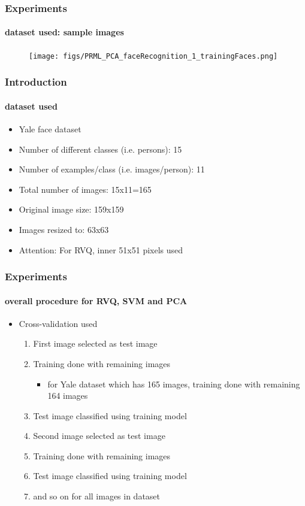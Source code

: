 \begin{frame}
\frametitle{Experiments}
\framesubtitle{dataset used: sample images}
\logoEvolution\mypagenum	
	\begin{figure}
		\texttt{[image: figs/PRML\_PCA\_faceRecognition\_1\_trainingFaces.png]}
	\end{figure}
\end{frame}

\begin{frame}
\frametitle{Introduction}
\framesubtitle{dataset used}
\logoCSIPCPL\mypagenum
	\begin{itemize}
		\item Yale face dataset
		\item Number of different classes (i.e. persons): 15
		\item Number of examples/class (i.e. images/person): 11
		\item Total number of images: 15x11=165
		\item Original image size: 159x159
		\item Images resized to: 63x63
		\item {\color{red}Attention: For RVQ, inner 51x51 pixels used}
	\end{itemize}
\end{frame}


\begin{frame}
\frametitle{Experiments}
\framesubtitle{overall procedure for RVQ, SVM and PCA}
\logoCSIPCPL\mypagenum
	\begin{itemize}
		\item {\color{red}Cross-validation} used
			\begin{enumerate}
				\item First image selected as test image
				\item Training done with remaining images
					\begin{itemize}
						\item for Yale dataset which has 165 images, training done with remaining 164 images
					\end{itemize}
				\item Test image classified using training model
				\item Second image selected as test image
				\item Training done with remaining images
				\item Test image classified using training model
				\item and so on for all images in dataset
			\end{enumerate}
	\end{itemize}
\end{frame}




